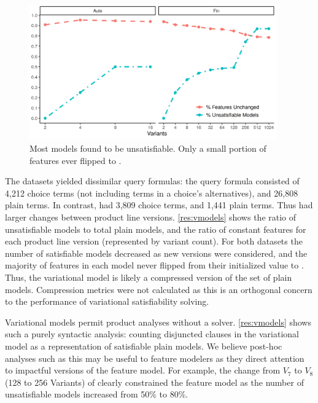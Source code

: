 ~\label{section:case-studies:results-and-discussion}

\begin{figure}
  \includegraphics[width=0.95\textwidth]{Plots/VModel}
  \caption{Most models found to be unsatisfiable. Only a small portion of
    features ever flipped to \tru.}%
  \label{res:vmodels}
\end{figure}

The datasets yielded dissimilar query formulas: the \auto{} query formula
consisted of 4,212 choice terms (not including terms in a choice's
alternatives), and 26,808 plain terms. In contrast, \fin{} had 3,809 choice
terms, and 1,441 plain terms. Thus \fin{} had larger changes between product
line versions. \autoref{res:vmodels} shows the ratio of unsatisfiable models to
total plain models, and the ratio of constant features for each product line
version (represented by variant count). For both datasets the number of
satisfiable models decreased as new versions were considered, and the majority
of features in each model never flipped from their initialized value \fls{} to
\tru{}. Thus, the variational model is likely a compressed version of the set
of plain models. Compression metrics were not calculated as this is an
orthogonal concern to the performance of variational satisfiability solving.

Variational models permit product analyses without a \sat{} solver.
\autoref{res:vmodels} shows such a purely syntactic analysis: counting
disjuncted clauses in the variational model as a representation of satisfiable
plain models. We believe post-hoc analyses such as this may be useful to feature
modelers as they direct attention to impactful versions of the feature model.
For example, the change from $V_{7}$ to $V_{8}$ (128 to 256 Variants) of \fin{}
clearly constrained the feature model as the number of unsatisfiable models
increased from 50\% to 80\%.

